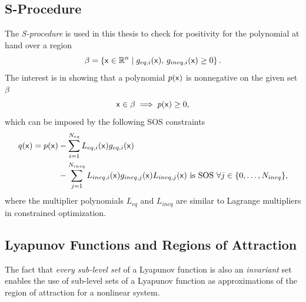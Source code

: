 

\subsection{S-Procedure}
\label{sec:s-procedure}

The \textit{S-procedure} is used in this thesis to check for positivity for the
polynomial at hand over a region
\[
  \beta = \lbrace{\mathbf{\mathsf{x}}} \in \mathbb{R}^n \mid g_{eq,i}({\mathbf{\mathsf{x}}}),\,g_{ineq,i}({\mathbf{\mathsf{x}}})
    \geq 0\rbrace \, .
\]
The interest is in showing that a polynomial \(p({\mathbf{\mathsf{x}}})\) is nonnegative on
the given set \(\beta\) \ie
\[
  {\mathbf{\mathsf{x}}} \in \beta \implies p({\mathbf{\mathsf{x}}}) \geq 0,
\]
which can be imposed by the following SOS constraints
\begin{align*}
  q({\mathbf{\mathsf{x}}}) = p({\mathbf{\mathsf{x}}}) &- \sum_{i=1}^{N_{eq}}L_{eq,i}({\mathbf{\mathsf{x}}})g_{eq,i}({\mathbf{\mathsf{x}}}) \\ &-
                                                                                            \sum_{j=1}^{N_{ineq}}L_{ineq,i}({\mathbf{\mathsf{x}}})g_{ineq,j}({\mathbf{\mathsf{x}}})
                                                                                            L_{ineq,j}({\mathbf{\mathsf{x}}}) \text{ is SOS } \forall j \in \lbrace0,\ldots,N_{ineq}\rbrace,
\end{align*} 
where the multiplier polynomials \(L_{eq}\) and \(L_{ineq}\) are similar to
Lagrange multipliers in constrained optimization.

\subsection{Lyapunov Functions and Regions of Attraction}

The fact that \textit{every sub-level set} of a Lyapunov function is also an
\textit{invariant} set enables the use of sub-level sets of a Lyapunov function
as approximations of the region of attraction for a nonlinear system.

